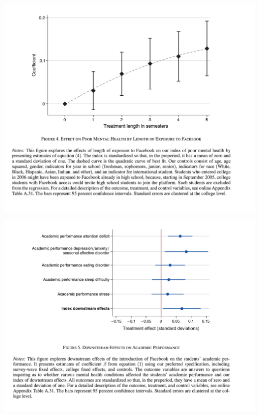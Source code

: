 \documentclass{beamer}
\begin{document}
\begin{frame}
\begin{center}
\includegraphics[scale=0.35]{./lecture_includes/facebook_5}
\end{center}
\end{frame}

\begin{frame}
\begin{center}
\includegraphics[scale=0.35]{./lecture_includes/facebook_6}
\end{center}
\end{frame}
\end{document}
